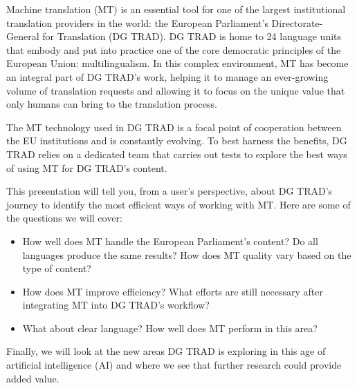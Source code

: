 Machine translation (MT) is an essential tool for one of the largest institutional translation providers in the world: the European Parliament’s Directorate-General for Translation (DG TRAD). DG TRAD is home to 24 language units that embody and put into practice one of the core democratic principles of the European Union: multilingualism. In this complex environment, MT has become an integral part of DG TRAD’s work, helping it to manage an ever-growing volume of translation requests and allowing it to focus on the unique value that only humans can bring to the translation process. 

The MT technology used in DG TRAD is a focal point of cooperation between the EU institutions and is constantly evolving. To best harness the benefits, DG TRAD relies on a dedicated team that carries out tests to explore the best ways of using MT for DG TRAD’s content. 

This presentation will tell you, from a user’s perspective, about DG TRAD’s journey to identify the most efficient ways of working with MT. Here are some of the questions we will cover:

\begin{itemize}
\item How well does MT handle the European Parliament’s content? Do all languages produce the same results? How does MT quality vary based on the type of content?
\item How does MT improve efficiency? What efforts are still necessary after integrating MT into DG TRAD’s workflow?
\item What about clear language? How well does MT perform in this area?
\end{itemize}

Finally, we will look at the new areas DG TRAD is exploring in this age of artificial intelligence (AI) and where we see that further research could provide added value.


